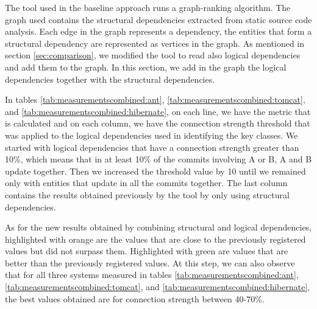\documentclass[12pt, a4paper, twoside]{report}
\begin{document}
The tool used in the baseline approach runs a graph-ranking algorithm. 
The graph used contains the structural dependencies extracted from static source code analysis.
Each edge in the graph represents a dependency, the entities that form a structural dependency are represented as vertices in the graph. 
As mentioned in section \ref{sec:comparison}, we modified the tool to read also logical dependencies and add them to the graph. 
In this section, we add in the graph the logical dependencies together with the structural dependencies. 

In tables \ref{tab:measurementscombined:ant}, \ref{tab:measurementscombined:tomcat}, and \ref{tab:measurementscombined:hibernate}, on each line, we have the metric that is calculated and on each column, we have the connection strength threshold that was applied to the logical dependencies used in identifying the key classes.
We started with logical dependencies that have a connection strength greater than 10\%, which means that in at least 10\% of the commits involving A or B, A and B update together. Then we increased the threshold value by 10 until we remained only with entities that update in all the commits together. The last column contains the results obtained previously by the tool by only using structural dependencies.

As for the new results obtained by combining structural and logical dependencies, highlighted with orange are the values that are close to the previously registered values but did not surpass them. Highlighted with green are values that are better than the previously registered values. At this step, we can also observe that for all three systems measured in tables \ref{tab:measurementscombined:ant}, \ref{tab:measurementscombined:tomcat}, and \ref{tab:measurementscombined:hibernate}, the best values obtained are for connection strength between 40-70\%.
\end{document}
